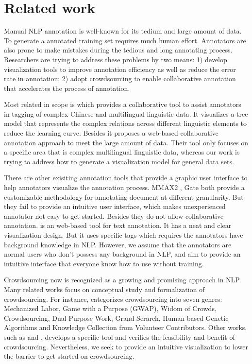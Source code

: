 \section{Related work}
Manual NLP annotation is well-known for its tedium and large amount of data. To generate a annotated training set requires much human effort. Annotators are also prone to make mistakes during the tedious and long annotating process. Researchers are trying to address these problems by two means: 1) develop visualization tools to improve annotation efficiency as well as reduce the error rate in annotation; 2) adopt crowdsourcing to enable collaborative annotation that accelerates the process of annotation.

Most related in scope is \cite{yan2012collaborative} which provides a collaborative tool to assist annotators in tagging of complex Chinese and multilingual linguistic data. It visualizes a tree model that represents the complex relations across different linguistic elements to reduce the learning curve. Besides it proposes a web-based collaborative annotation approach to meet the large amount of data. Their tool only focuses on a specific area that is complex multilingual linguistic data, whereas our work is trying to address how to generate a visualization model for general data sets.

There are other exisiting annotation tools that provide a graphic user interface to help annotators visualize the annotation process. MMAX2 \cite{mueller06b}, Gate \cite{gate} both provide a customizable methodology for annotating document at different granularity. But they fail to provide an intuitive user interface, which makes unexperienced annotator not easy to get started. Besides they do not allow collaborative annotation. \cite{brat} is an web-based tool for text annotation. It has a neat and clear visualization design. But it uses specific tags which requires the annotators have background knowledge in NLP. However, we assume that the annotators are normal users who don't possess any background in NLP, and aim to provide an intuitive interface that everyone know how to use without training.

Crowdsourcing now is recognized as a growing and promising approach in NLP. Many related works focus on conceptual study and formalization of crowdsourcing. For instance, \cite{quinn2009taxonomy} categorizes crowdsourcing into seven genres: Mechanized Labor, Game with a Purpose (GWAP), Widom of Crowds, Crowdsourcing, Dual-Purpose Work, Grand Serarch, Human-based Genetic Algorithms and Knowledge Collection from Volunteer Contributors. Other works, such as \cite{abekawa2010community} and \cite{irvine2010using}, develops a specific tool and verifies the feasibility and benefit of crowdsourcing. Nevertheless, we seek to provide an intuitive visualization to lower the barrier to get started on crowdsourcing. 
